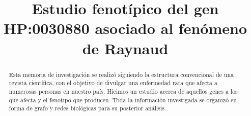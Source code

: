 \documentclass{bmcart}
\begin{document}
	\begin{frontmatter}
	
		\begin{fmbox}
			
			
			\title{Estudio fenotípico del gen HP:0030880 asociado al fenómeno de Raynaud}
			
			
			\author[
			  addressref={aff1},                   %
			  corref={aff1},                       %
			  email={jaldanam21@uma.es}   %
			]{ } %
			\author[
			  addressref={aff1},
			  email={juancaruru@uma.es}
			]{ }
			
			
			\address[id=aff1]{%
			  ,             %
			  ,          %
			  ,                              %
			}
		
		\end{fmbox}%
		
		\begin{abstractbox}
		
			\begin{abstract} %
			
			Esta memoria de investigación se realizó siguiendo la estructura convencional de una revista científica, con el objetivo de divulgar una enfermedad rara que afecta a numerosas personas en nuestro país. Hicimos un estudio acerca de aquellos genes a los que afecta y el fenotipo que producen. Toda la información investigada se organizó en forma de grafo y redes biológicas para su posterior análisis.
						

\end{abstract}
\end{abstractbox}
\end{frontmatter}
\end{document}
